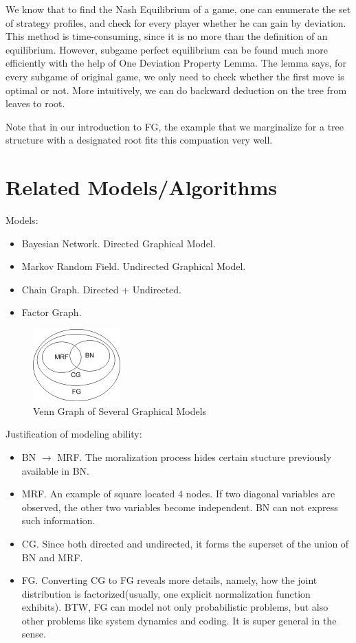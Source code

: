 We know that to find the Nash Equilibrium of a game, 
one can enumerate the set of strategy profiles, and 
check for every player whether he can gain by deviation. 
This method is time-consuming, since it is no more than 
the definition of an equilibrium. However, subgame perfect 
equilibrium can be found much more efficiently with the help 
of One Deviation Property Lemma\cite{osborne1994course}. 
The lemma says, for every subgame of original game, we 
only need to check whether the first move is optimal or not. 
More intuitively, we can do backward deduction on the tree
from leaves to root. 

Note that in our introduction to FG, the example that we marginalize
for a tree structure with a designated root fits this compuation very 
well. 


\section{Related Models/Algorithms}

Models:
\begin{itemize}
	\item Bayesian Network. Directed Graphical Model. 
	\item Markov Random Field. Undirected Graphical Model.
	\item Chain Graph. Directed + Undirected.  
	\item Factor Graph. 
\end{itemize}

\begin{figure}[htb]
\centering
	\includegraphics[width=0.3\textwidth]{illustration/graphical-venn.png}
	\caption{Venn Graph of Several Graphical Models}
\end{figure}

Justification of modeling ability:
\begin{itemize}
	\item BN $\rightarrow$ MRF. The moralization process hides certain stucture 
	previously available in BN. 
	\item MRF. An example of square located 4 nodes. If two diagonal variables 
	are observed, the other two variables become independent. BN can not express 
	such information. 
	\item CG. Since both directed and undirected, it forms the superset of 
	the union of BN and	MRF.
	\item FG. Converting CG to FG reveals more details, namely, how the joint 
	distribution is factorized(usually, one explicit normalization function 
	exhibits). BTW, FG can model not only probabilistic problems, but also 
	other problems like system dynamics and coding. It is super general in the
	sense.
\end{itemize}


